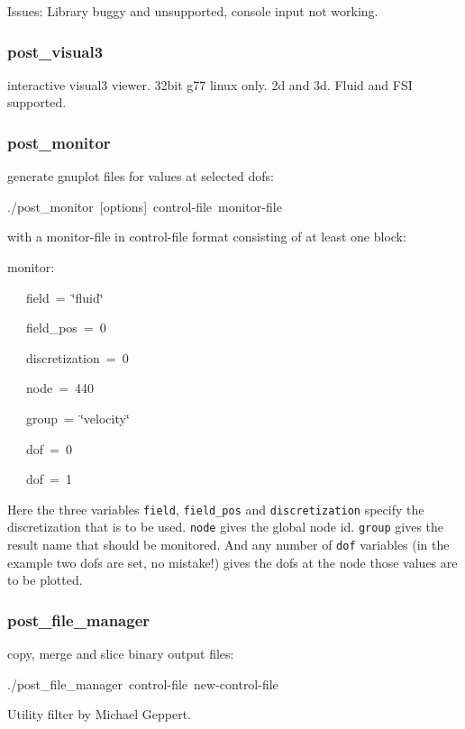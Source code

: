 Issues: Library buggy and unsupported, console input not working.


\subsubsection{post\_visual3}

interactive visual3 viewer. 32bit g77 linux only. 2d and 3d. Fluid
and FSI supported.


\subsubsection{post\_monitor}

generate gnuplot files for values at selected dofs:

\begin{lyxcode}
./post\_monitor~{[}options]~control-file~monitor-file
\end{lyxcode}
with a monitor-file in control-file format consisting of at least
one block:

\begin{lyxcode}
monitor:

~~~field~=~\char`\"{}fluid\char`\"{}

~~~field\_pos~=~0

~~~discretization~=~0

~~~node~=~440

~~~group~=~\char`\"{}velocity\char`\"{}

~~~dof~=~0

~~~dof~=~1
\end{lyxcode}
Here the three variables \texttt{field}, \texttt{field\_pos} and \texttt{discretization}
specify the discretization that is to be used. \texttt{node} gives
the global node id. \texttt{group} gives the result name that should
be monitored. And any number of \texttt{dof} variables (in the example
two dofs are set, no mistake!) gives the dofs at the node those values
are to be plotted.


\subsubsection{post\_file\_manager}

copy, merge and slice binary output files:

\begin{lyxcode}
./post\_file\_manager~control-file~new-control-file
\end{lyxcode}
Utility filter by Michael Geppert.


